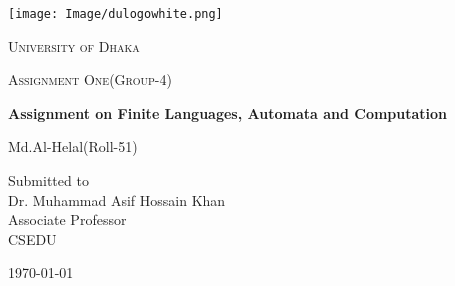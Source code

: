 \documentclass[12pt,a4paper]{report}
\begin{document}
\begin{titlepage}
\centering
\texttt{[image: Image/dulogowhite.png]}\\
{\scshape\LARGE University of Dhaka \par}
\vspace{1cm}
{\scshape\Large Assignment One(Group-4)\par}
\vspace{1.5cm}
{\huge\bfseries Assignment on Finite Languages, Automata and Computation\par}
\vspace{2cm}
{\Large Md.Al-Helal(Roll-51)\par}
\vfill
Submitted to \\
\vspace{0.5cm}
Dr. Muhammad Asif Hossain Khan\\ Associate Professor\\CSEDU
\vfill
{\large \today\par}
\end{titlepage}
\end{document}
